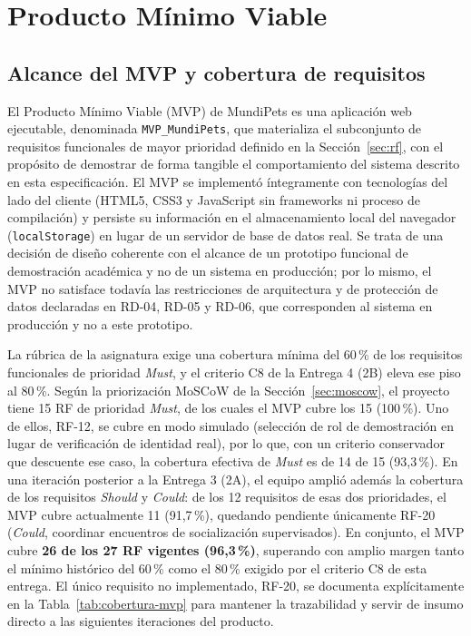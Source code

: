 \documentclass[journal,onecolumn]{IEEEtran}
\begin{document}
	\section{Producto Mínimo Viable}
	\label{sec:mvp}
	
	\subsection{Alcance del MVP y cobertura de requisitos}
	\label{sec:mvp-alcance}
	
	El Producto Mínimo Viable (MVP) de MundiPets es una aplicación web
	ejecutable, denominada \texttt{MVP\_MundiPets}, que materializa el
	subconjunto de requisitos funcionales de mayor prioridad definido en la
	Sección~\ref{sec:rf}, con el propósito de demostrar de forma tangible el
	comportamiento del sistema descrito en esta especificación. El MVP se
	implementó íntegramente con tecnologías del lado del cliente (HTML5, CSS3 y
	JavaScript sin frameworks ni proceso de compilación) y persiste su
	información en el almacenamiento local del navegador
	(\texttt{localStorage}) en lugar de un servidor de base de datos real. Se
	trata de una decisión de diseño coherente con el alcance de un prototipo
	funcional de demostración académica y no de un sistema en producción; por
	lo mismo, el MVP no satisface todavía las restricciones de arquitectura y
	de protección de datos declaradas en RD-04, RD-05 y RD-06, que
	corresponden al sistema en producción y no a este prototipo.
	
	La rúbrica de la asignatura exige una cobertura mínima del 60\,\% de los
	requisitos funcionales de prioridad \emph{Must}, y el criterio C8 de la
	Entrega 4 (2B) eleva ese piso al 80\,\%. Según la priorización MoSCoW de
	la Sección~\ref{sec:moscow}, el proyecto tiene 15 RF de prioridad
	\emph{Must}, de los cuales el MVP cubre los 15 (100\,\%). Uno de ellos,
	RF-12, se cubre en modo simulado (selección de rol de demostración en
	lugar de verificación de identidad real), por lo que, con un criterio
	conservador que descuente ese caso, la cobertura efectiva de \emph{Must}
	es de 14 de 15 (93,3\,\%). En una iteración posterior a la Entrega 3 (2A),
	el equipo amplió además la cobertura de los requisitos \emph{Should} y
	\emph{Could}: de los 12 requisitos de esas dos prioridades, el MVP cubre
	actualmente 11 (91,7\,\%), quedando pendiente únicamente RF-20
	(\emph{Could}, coordinar encuentros de socialización supervisados). En
	conjunto, el MVP cubre \textbf{26 de los 27 RF vigentes (96,3\,\%)},
	superando con amplio margen tanto el mínimo histórico del 60\,\% como el
	80\,\% exigido por el criterio C8 de esta entrega. El único requisito no
	implementado, RF-20, se documenta explícitamente en la
	Tabla~\ref{tab:cobertura-mvp} para mantener la trazabilidad y servir de
	insumo directo a las siguientes iteraciones del producto.
	
\end{document}
